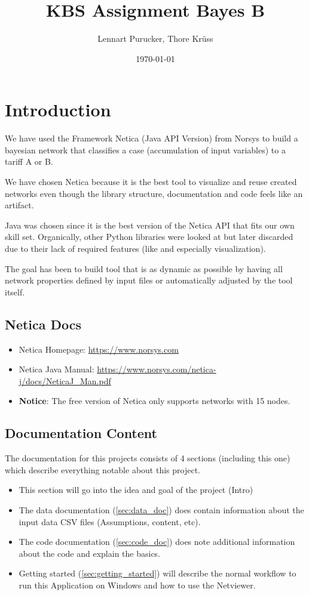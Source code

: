 \documentclass[12pt]{scrartcl}
\title{KBS Assignment Bayes B}
\author{Lennart Purucker, Thore Krüss}
\date{\today}
\begin{document}
\maketitle

\tableofcontents

\newpage

\section{Introduction}
\label{sec:intro}
We have used the Framework Netica (Java API Version) from Norsys to build a bayesian network that classifies a case (accumulation of input variables) to a tariff A or B.

We have chosen Netica because it is the best tool to visualize and reuse created networks even though the library structure, documentation and code feels like an artifact.

Java was chosen since it is the best version of the Netica API that fits our own skill set. Organically, other Python libraries were looked at but later discarded due to their lack of required features (like and especially visualization).

The goal has been to build tool that is as dynamic as possible by having all network properties defined by input files or automatically adjusted by the tool itself.

\subsection{Netica Docs}
\begin{itemize}
    \item Netica Homepage: \url{https://www.norsys.com}
    \item Netica Java Manual: \url{https://www.norsys.com/netica-j/docs/NeticaJ_Man.pdf}
    \item \textbf{Notice}: The free version of Netica only supports networks with 15 nodes.
\end{itemize}

\subsection{Documentation Content}
The documentation for this projects consists of 4 sections (including this one) which describe everything notable about this project.
\begin{itemize}
    \item This section will go into the idea and goal of the project (Intro)
    \item The data documentation (\autoref{sec:data_doc}) does contain information about the input data CSV files (Assumptions, content, etc).
    \item The code documentation (\autoref{sec:code_doc}) does note additional information about the code and explain the basics.
    \item Getting started (\autoref{sec:getting_started}) will describe the normal workflow to run this Application on Windows and how to use the Netviewer.
\end{itemize}
\end{document}
